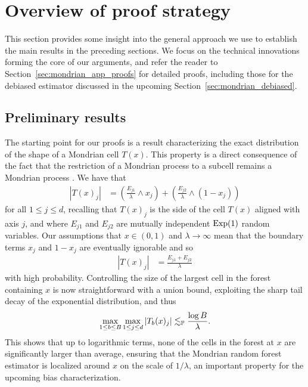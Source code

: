 \section{Overview of proof strategy}%
\label{sec:mondrian_overview_proofs}

This section provides some insight into the general approach we use to
establish the main results in the preceding sections. We focus on the technical
innovations forming the core of our arguments, and refer the reader to
Section~\ref{sec:mondrian_app_proofs} for detailed proofs, including those for
the
debiased estimator discussed in the upcoming
Section~\ref{sec:mondrian_debiased}.

\subsection*{Preliminary results}

The starting point for our proofs is a result characterizing the exact
distribution of the shape of a Mondrian cell $T(x)$. This property is a direct
consequence of the fact that the restriction of a Mondrian process to a subcell
remains a Mondrian process \citep[Fact~2]{mourtada2020minimax}. We have that
%
\begin{align*}
  |T(x)_j|
  &= \left( \frac{E_{j1}}{\lambda} \wedge x_j \right)
  + \left( \frac{E_{j2}}{\lambda} \wedge (1-x_j) \right)
\end{align*}
%
for all $1 \leq j \leq d$, recalling that $T(x)_j$ is the side of the cell
$T(x)$ aligned with axis $j$, and where $E_{j1}$ and $E_{j2}$ are mutually
independent $\Exp(1)$ random variables. Our assumptions that $x \in (0,1)$ and
$\lambda \to \infty$ mean that the boundary terms $x_j$ and $1-x_j$ are
eventually ignorable and so
%
\begin{align*}
  |T(x)_j| &= \frac{E_{j1} + E_{j2}}{\lambda}
\end{align*}
%
with high probability. Controlling the size of the largest cell in the forest
containing $x$ is now straightforward with a union bound, exploiting the sharp
tail decay of the exponential distribution, and thus
%
\begin{align*}
  \max_{1 \leq b \leq B} \max_{1 \leq j \leq d} |T_b(x)_j|
  \lesssim_\P \frac{\log B}{\lambda}.
\end{align*}
%
This shows that up to logarithmic terms, none of the cells in the forest at $x$
are significantly larger than average, ensuring that the Mondrian random forest
estimator is localized around $x$ on the scale of $1/\lambda$, an important
property for the upcoming bias characterization.

